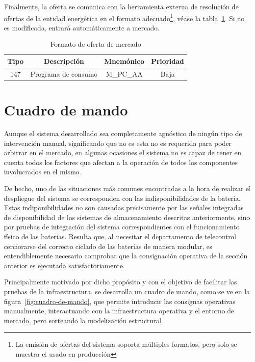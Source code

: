 Finalmente, la oferta se comunica con la herramienta externa de resolución de ofertas de la entidad energética en el formato adecuado\footnote{La emisión de ofertas del sistema soporta múltiples formatos, pero solo se muestra el usado en producción}, véase la tabla~\ref{tab:formato-oferta}. Si no es modificada, entrará automáticamente a mercado.

\begin{table}[ht]
  \centering
  \begin{tabular}{|c|c|c|c|}
    \hline
    Tipo & Descripción         & Mnemónico & Prioridad\\
    \hline
    147  & Programa de consumo & M\_PC\_AA & Baja     \\
    \hline
  \end{tabular}
  \caption{Formato de oferta de mercado}
  \label{tab:formato-oferta}
\end{table}

\section{Cuadro de mando}
\label{makereference6.2}

Aunque el sistema desarrollado sea completamente agnóstico de ningún tipo de intervención manual, significando que no es esta no es requerida para poder arbitrar en el mercado, en algunas ocasiones el sistema no es capaz de tener en cuenta todos los factores que afectan a la operación de todos los componentes involucrados en el mismo.

De hecho, uno de las situaciones más comunes encontradas a la hora de realizar el despliegue del sistema se corresponden con las indisponibilidades de la batería. Estas indiponibilidades no son causadas precisamente por las señales integradas de disponibilidad de los sistemas de almacenamiento descritas anteriormente, sino por pruebas de integración del sistema correspondientes con el funcionamiento físico de las baterías. Resulta que, al necesitar el departamento de telecontrol cerciorarse del correcto ciclado de las baterías de manera modular, es entendiblemente necesario comprobar que la consignación operativa de la sección anterior es ejecutada satisfactoriamente.

Principalmente motivado por dicho propósito y con el objetivo de facilitar las pruebas de la infraestructura, se desarrolla un cuadro de mando, como se ve en la figura~\ref{fig:cuadro-de-mando}, que permite introducir las consignas operativas manualmente, interactuando con la infraestructura operativa y el entorno de mercado, pero sorteando la modelización  estructural.

